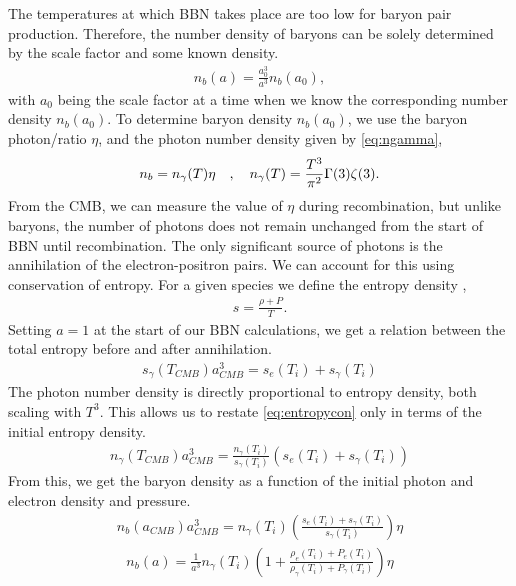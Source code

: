 The temperatures at which BBN takes place are too low for baryon pair production. Therefore, the number density of baryons can be solely determined by the scale factor and some known density. 
\begin{align}
    n_b(a)=\frac{a_0^3}{a^3}n_{b}(a_0),
\end{align}
with $a_0$ being the scale factor at a time when we know the corresponding number density $n_{b}(a_0)$. To determine baryon density $n_{b}(a_0)$, we use the baryon photon/ratio $\eta$, and the photon number density given by \cref{eq:ngamma}, 
\begin{align}
    n_b=n_\gamma(T) \eta \quad , \quad n_\gamma(T)=\frac{T^3}{\pi^2}\Gamma(3)\zeta(3).
\end{align}
From the CMB, we can measure the value of $\eta$ during recombination, but unlike baryons, the number of photons does not remain unchanged from the start of BBN until recombination. The only significant source of photons is the annihilation of the electron-positron pairs. We can account for this using conservation of entropy. For a given species we define the entropy density \cite[(3.91)]{kolbturner},
\begin{align}
    s=\frac{\rho+P}{T}.
\end{align}
Setting $a=1$ at the start of our BBN calculations, we get a relation between the total entropy before and after annihilation.
\begin{align}
     s_{\gamma}(T_{CMB})a_{CMB}^3= s_e(T_{i})+s_{\gamma}(T_{i})
    \label{eq:entropycon}
\end{align}
The photon number density is directly proportional to entropy density, both scaling with $T^3$. This allows us to restate \eqref{eq:entropycon} only in terms of the initial entropy density.
\begin{align}
    n_{\gamma}(T_{CMB})a_{CMB}^3 = \frac{n_\gamma(T_{i})}{s_{\gamma}(T_{i})}\left(s_e(T_{i})+s_{\gamma}(T_{i})\right)
\end{align}
From this, we get the baryon density as a function of the initial photon and electron density and pressure.
\begin{align}
    n_b(a_{CMB}){a_{CMB}^3}=n_\gamma(T_{i}) \left(\frac{s_e(T_{i})+s_{\gamma}(T_{i})}{s_{\gamma}(T_{i})}\right)\eta
\end{align}
\begin{align}
    n_b(a)=\frac{1}{a^3}n_\gamma(T_{i}) \left(1+\frac{\rho_e(T_{i})+P_{e}(T_{i})}{\rho_{\gamma}(T_{i})+P_{\gamma}(T_{i})}\right)\eta
    \label{n_b}
\end{align}
